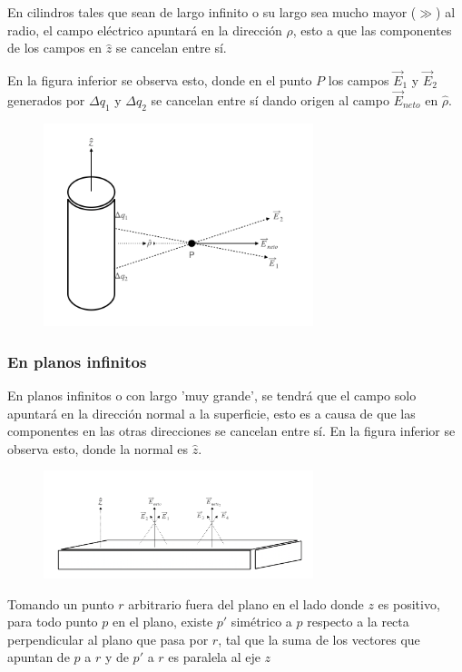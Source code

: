 \label{SimetríaCilindrosInf}
En cilindros tales que sean de largo infinito o su largo sea mucho mayor ($\gg$) al radio, el campo eléctrico apuntará en la dirección $\hat{\rho}$, esto a que las componentes de los campos en $\hat{z}$ se cancelan entre sí.

En la figura inferior se observa esto, donde en el punto $P$ los campos $\Vec{E}_1$ y $\Vec{E}_2$ generados por $\Delta q_1$ y $\Delta q_2$ se cancelan entre sí dando origen al campo $\Vec{E}_{neto}$ en $\hat{\rho}$.
\begin{figure}[H]
    \centering
    \includegraphics[width=0.7\textwidth]{Resultados utiles/demost_simetria_cili.png}
    \label{fig:simetria_cilindro}
\end{figure}
\subsubsection{En planos infinitos}
\label{SimetríaPlanosInf}
En planos infinitos o con largo 'muy grande', se tendrá que el campo solo apuntará en la dirección normal a la superficie, esto es a causa de que las componentes en las otras direcciones se cancelan entre sí. 
\medbreak
En la figura inferior se observa esto, donde la normal es $\hat{z}$.
\begin{figure}[H]
    \centering
    \includegraphics[width=0.7\textwidth]{Resultados utiles/demost_simetria_plano.png}
    \label{fig:simetria_plano}
\end{figure}
\medbreak
Tomando un punto $r$ arbitrario fuera del plano en el lado donde $z$ es positivo, para todo punto $p$ en el plano, existe $p'$ simétrico a $p$ respecto a la recta perpendicular al plano que pasa por $r$, tal que la suma de los vectores que apuntan de $p$ a $r$ y de $p'$ a $r$ es paralela al eje $z$

